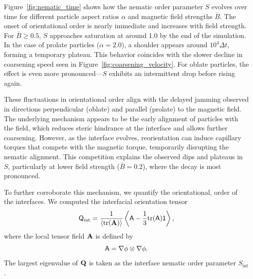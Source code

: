 Figure~\ref{fig:nematic_time} shows how the nematic order parameter \(S\) evolves over time for different particle aspect ratios \(\alpha\) and magnetic 
field strengths \(\bar{B}\). The onset of orientational order is nearly immediate and increases with field strength. For \(\bar{B} \ge 0.5\), \(S\) 
approaches saturation at around 1.0 by the end of the simulation. In the case of prolate particles (\(\alpha = 2.0\)), a shoulder appears around 
\(10^4 \Delta t\), forming a temporary plateau. This behavior coincides with the slower decline in coarsening speed seen in 
Figure~\ref{fig:coarsening_velocity}. For oblate particles, the effect is even more pronounced—\(S\) exhibits an intermittent drop before rising again.
    
These fluctuations in orientational order align with the delayed jamming observed in directions perpendicular (oblate) and parallel (prolate) to the 
magnetic field. The underlying mechanism appears to be the early alignment of particles with the field, which reduces steric hindrance at the interface 
and allows further coarsening. However, as the interface evolves, reorientation can induce capillary torques that compete with the magnetic torque, 
temporarily disrupting the nematic alignment. This competition explains the observed dips and plateaus in \(S\), particularly at lower field strength 
(\(\bar{B} = 0.2\)), where the decay is most pronounced.
    
To further corroborate this mechanism, we quantify the orientational, order of the interfaces. We computed the interfacial orientation tensor
    \begin{equation}
    \tens{Q}_{\text{int}} = \frac{1}{\langle \mathrm{tr}(\tens{A}) \rangle} \left\langle \tens{A} - \frac{1}{3} \mathrm{tr}(\tens{A}) \mathsf{1} \right\rangle ,
    \end{equation}
where the local tensor field \(\tens{A}\) is defined by
    \begin{equation}
    \tens{A} = \nabla \phi \otimes \nabla \phi .
    \end{equation}
The largest eigenvalue of \(\tens{Q}\) is taken as the interface nematic order parameter $S_{\text{int}}$.
    
